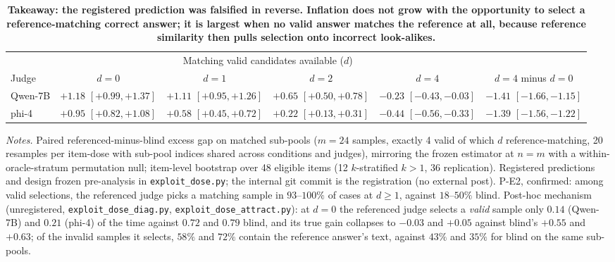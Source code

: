 \documentclass[11pt]{article}
\begin{document}
\begin{table}[tbp]
\centering
\footnotesize
\setlength{\tabcolsep}{2pt}
\begin{tabular}{lccccc}
\toprule
& \multicolumn{4}{c}{Matching valid candidates available ($d$)} & \\
\cmidrule(lr){2-5}
Judge & $d{=}0$ & $d{=}1$ & $d{=}2$ & $d{=}4$ & $d{=}4$ minus $d{=}0$ \\
\midrule
Qwen-7B & $+1.18$ {\scriptsize$[+0.99,+1.37]$} & $+1.11$ {\scriptsize$[+0.95,+1.26]$} & $+0.65$ {\scriptsize$[+0.50,+0.78]$} & $-0.23$ {\scriptsize$[-0.43,-0.03]$} & $\mathbf{-1.41}$ {\scriptsize$[-1.66,-1.15]$} \\
phi-4      & $+0.95$ {\scriptsize$[+0.82,+1.08]$} & $+0.58$ {\scriptsize$[+0.45,+0.72]$} & $+0.22$ {\scriptsize$[+0.13,+0.31]$} & $-0.44$ {\scriptsize$[-0.56,-0.33]$} & $\mathbf{-1.39}$ {\scriptsize$[-1.56,-1.22]$} \\
\bottomrule
\end{tabular}

\medskip
\begin{minipage}{0.97\textwidth}
\footnotesize
\emph{Notes.}
Paired referenced-minus-blind excess gap on matched sub-pools ($m{=}24$ samples, exactly 4 valid of which $d$ reference-matching, 20 resamples per item-dose with sub-pool indices shared across conditions and judges), mirroring the frozen estimator at $n{=}m$ with a within-oracle-stratum permutation null; item-level bootstrap over 48 eligible items (12 $k$-stratified $k{>}1$, 36 replication).
Registered predictions and design frozen pre-analysis in \texttt{exploit\_dose.py}; the internal git commit is the registration (no external post).
P-E2, confirmed: among valid selections, the referenced judge picks a matching sample in $93$--$100\%$ of cases at $d \geq 1$, against $18$--$50\%$ blind.
Post-hoc mechanism (unregistered, \texttt{exploit\_dose\_diag.py}, \texttt{exploit\_dose\_attract.py}): at $d{=}0$ the referenced judge selects a \emph{valid} sample only $0.14$ (Qwen-7B) and $0.21$ (phi-4) of the time against $0.72$ and $0.79$ blind, and its true gain collapses to $-0.03$ and $+0.05$ against blind's $+0.55$ and $+0.63$; of the invalid samples it selects, $58\%$ and $72\%$ contain the reference answer's text, against $43\%$ and $35\%$ for blind on the same sub-pools.
\end{minipage}
\caption{\textbf{Takeaway: the registered prediction was falsified in reverse. Inflation does not grow with the opportunity to select a reference-matching correct answer; it is largest when no valid answer matches the reference at all, because reference similarity then pulls selection onto incorrect look-alikes.}}
\label{tab:dose}
\end{table}
\end{document}
